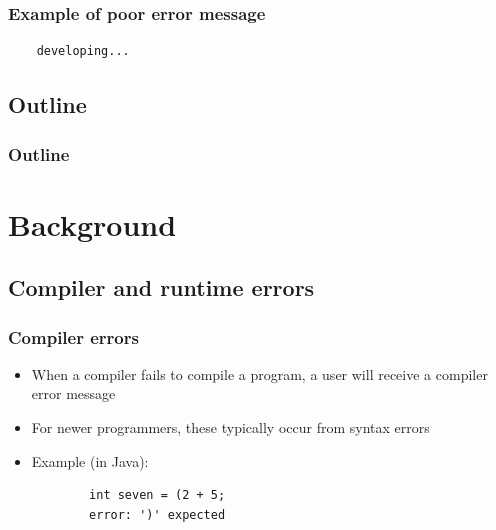 \documentclass{beamer}
\begin{document}
\begin{frame}[fragile]
	\frametitle{Example of poor error message}
	\begin{verbatim}
	developing...
	\end{verbatim}
\end{frame}


\subsection*{Outline}

\begin{frame}
  \frametitle{Outline}
  \tableofcontents
\end{frame}

\section[Background]{Background}

\subsection{Compiler and runtime errors}

\begin{frame}[fragile]
	\frametitle{Compiler errors}
		\begin{itemize}
			\item When a compiler fails to compile a program, a user will receive a compiler error message
			\item For newer programmers, these typically occur from syntax errors
			\item Example (in Java):
			\begin{verbatim}
		int seven = (2 + 5;
		error: ')' expected
			\end{verbatim}
		\end{itemize}
\end{frame}
\end{document}
